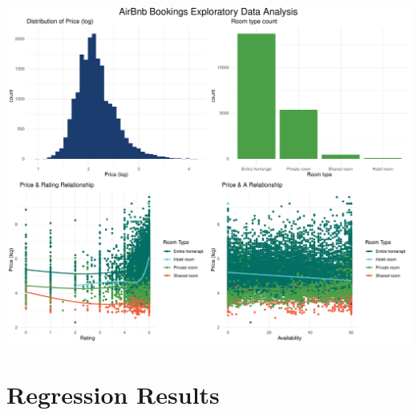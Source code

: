 \documentclass[
]{article}
\begin{document}
\includegraphics{lab2_report_files/figure-latex/eda_charts-1.pdf}

\hypertarget{regression-results}{%
\section{Regression Results}\label{regression-results}}
\end{document}
